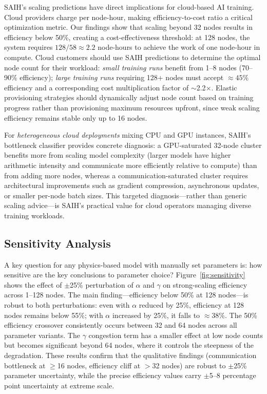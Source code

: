 \documentclass{llncs}
\begin{document}
SAIH's scaling predictions have direct implications for cloud-based AI training. Cloud providers charge per node-hour, making efficiency-to-cost ratio a critical optimization metric. Our findings show that scaling beyond 32 nodes results in efficiency below 50\%, creating a cost-effectiveness threshold: at 128 nodes, the system requires $128 / 58 \approx 2.2$ node-hours to achieve the work of one node-hour in compute. Cloud customers should use SAIH predictions to determine the optimal node count for their workload: \textit{small training runs} benefit from 1--8 nodes (70--90\% efficiency); \textit{large training runs} requiring 128+ nodes must accept $\approx 45\%$ efficiency and a corresponding cost multiplication factor of $\sim$2.2$\times$. Elastic provisioning strategies should dynamically adjust node count based on training progress rather than provisioning maximum resources upfront, since weak scaling efficiency remains stable only up to 16 nodes.

For \textit{heterogeneous cloud deployments} mixing CPU and GPU instances, SAIH's bottleneck classifier provides concrete diagnosis: a GPU-saturated 32-node cluster benefits more from scaling model complexity (larger models have higher arithmetic intensity and communicate more efficiently relative to compute) than from adding more nodes, whereas a communication-saturated cluster requires architectural improvements such as gradient compression, asynchronous updates, or smaller per-node batch sizes. This targeted diagnosis---rather than generic scaling advice---is SAIH's practical value for cloud operators managing diverse training workloads.

\subsection{Sensitivity Analysis}

A key question for any physics-based model with manually set parameters is: how sensitive are the key conclusions to parameter choice? Figure~\ref{fig:sensitivity} shows the effect of $\pm$25\% perturbation of $\alpha$ and $\gamma$ on strong-scaling efficiency across 1--128 nodes. The main finding---efficiency below 50\% at 128 nodes---is robust to both perturbations: even with $\alpha$ reduced by 25\%, efficiency at 128 nodes remains below 55\%; with $\alpha$ increased by 25\%, it falls to $\approx$38\%. The 50\% efficiency crossover consistently occurs between 32 and 64 nodes across all parameter variants. The $\gamma$ congestion term has a smaller effect at low node counts but becomes significant beyond 64 nodes, where it controls the steepness of the degradation. These results confirm that the qualitative findings (communication bottleneck at $\geq$16 nodes, efficiency cliff at $>$32 nodes) are robust to $\pm$25\% parameter uncertainty, while the precise efficiency values carry $\pm$5--8 percentage point uncertainty at extreme scale.
\end{document}
